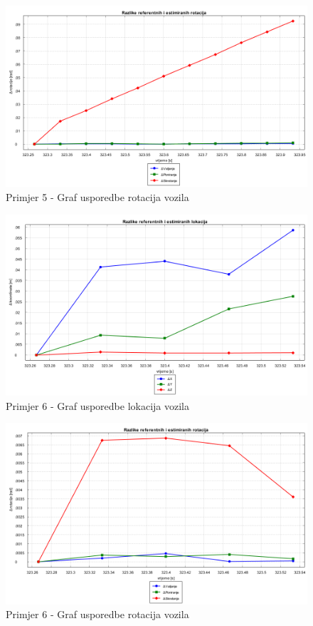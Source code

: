 \begin{figure}[H]
  \includegraphics[scale=0.4]{images/imgs/g1_rotacije.png}
  \caption{Primjer 5 - Graf usporedbe rotacija vozila}
  \label{eval:primjer_5_rotacija}
\end{figure}
\begin{figure}[H]
  \includegraphics[scale=0.4]{images/imgs/g2_lokacije.png}
  \caption{Primjer 6 - Graf usporedbe lokacija vozila}
  \label{eval:primjer_6_rotacija}
\end{figure}
\begin{figure}[H]
  \includegraphics[scale=0.4]{images/imgs/g2_rotacije.png}
  \caption{Primjer 6 - Graf usporedbe rotacija vozila}
  \label{eval:primjer_6_rotacija}
\end{figure}
\pagebreak
